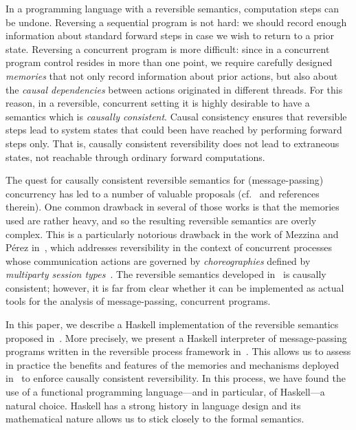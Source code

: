 \documentclass[runningheads]{llncs}
\begin{document}
In a programming language with a reversible semantics, computation steps can be undone.
Reversing a sequential program is not hard: we should record enough information about standard forward steps in case we wish to return to a prior state. Reversing a concurrent program is  more difficult: since in a concurrent program control resides in more than one point, we require carefully designed \emph{memories} that not only record information about prior actions, but also about the \emph{causal dependencies} between actions originated in different threads.
For this reason, in a reversible, concurrent setting it is highly desirable to have a semantics which is \emph{causally consistent}. Causal consistency ensures that reversible steps lead to system states that could been have reached by performing forward steps only. That is, causally consistent reversibility does not lead to extraneous states, not reachable through ordinary forward computations.

The quest for causally consistent reversible semantics for (message-passing) concurrency has led to a number of valuable proposals (cf.~\cite{DBLP:conf/ppdp/MezzinaP17} and references therein). One common drawback in several of those works is that the memories used are rather heavy, and so the resulting reversible semantics are overly complex. This is a particularly notorious drawback in the work of Mezzina and P\'{e}rez in~\cite{DBLP:conf/ppdp/MezzinaP17}, which addresses reversibility in the context of concurrent processes whose communication actions are governed by \emph{choreographies} defined by \emph{multiparty session types}~\cite{HYC08}. The reversible semantics developed in~\cite{DBLP:conf/ppdp/MezzinaP17} is causally consistent; however, it is far from clear whether it can be implemented as  actual tools for the  analysis of message-passing, concurrent programs.

In this paper, we describe a Haskell implementation of the reversible semantics proposed in~\cite{DBLP:conf/ppdp/MezzinaP17}. More precisely, we present a Haskell interpreter of message-passing programs written in the reversible process framework in~\cite{DBLP:conf/ppdp/MezzinaP17}. This allows us to assess in practice the benefits and features of the memories and mechanisms deployed in~\cite{DBLP:conf/ppdp/MezzinaP17} to enforce causally consistent reversibility. In this process, we have found the use of a functional programming language---and in particular, of Haskell---a natural choice. Haskell has a strong history in language design and its mathematical nature allows us to stick closely to the formal semantics.
\end{document}
